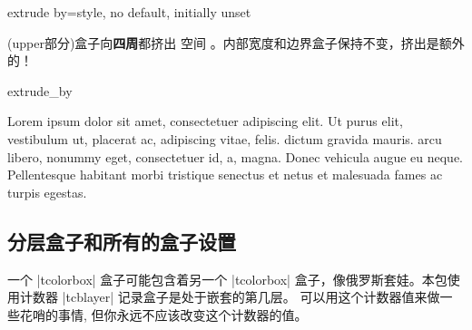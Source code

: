 \begin{docTcbKey}{extrude by}{=}{style, no default, initially unset}

  (upper部分)盒子向{\bf 四周}都挤出  空间%
  。内部宽度和边界盒子保持不变，挤出是额外的！
\begin{exdispExample}{extrude_by}

Lorem ipsum dolor sit amet, consectetuer adipiscing elit. Ut purus elit,
vestibulum ut, placerat ac, adipiscing vitae, felis.  dictum
gravida mauris. 
arcu libero, nonummy eget, consectetuer id,  a, magna. Donec
vehicula augue eu neque. Pellentesque habitant morbi tristique senectus et netus
et malesuada fames ac turpis egestas. 
\end{exdispExample}
\end{docTcbKey}



\subsection{分层盒子和所有的盒子设置}\label{subsec:everybox}

一个 |tcolorbox| 盒子可能包含着另一个 |tcolorbox| 盒子，像俄罗斯套娃。本包使用计数器 |tcblayer| 记录盒子是处于嵌套的第几层。 可以用这个计数器值来做一些花哨的事情, 但你永远不应该改变这个计数器的值。


